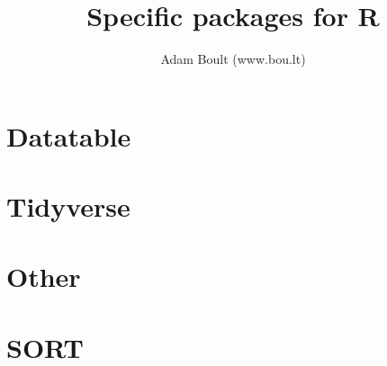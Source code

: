 \documentclass[oneside]{book}
\begin{document}
\author{Adam Boult (www.bou.lt)}
\title{Specific packages for R}
\maketitle

\setcounter{tocdepth}{0}
\tableofcontents



\part{Datatable}


\part{Tidyverse}








\part{Other}




\part{SORT}

\end{document}
